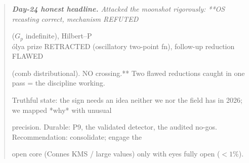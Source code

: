 \documentclass[10pt]{article}
\begin{document}
\begin{quote}\itshape
\textbf{Day-24 honest headline.} Attacked the moonshot rigorously: **OS recasting correct, mechanism REFUTED\par
($G_p$ indefinite), Hilbert--P\\\'olya prize RETRACTED (oscillatory two-point fn), follow-up reduction FLAWED\par
(comb distributional). NO crossing.** Two flawed reductions caught in one pass = the discipline working.\par
Truthful state: the sign needs an idea neither we nor the field has in 2026; we mapped *why* with unusual\par
precision. Durable: P9, the validated detector, the audited no-gos. Recommendation: consolidate; engage the\par
open core (Connes KMS / large values) only with eyes fully open ($<1\%$).\par
\end{quote}
\end{document}

